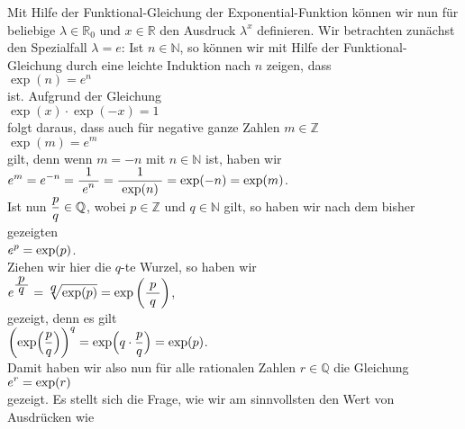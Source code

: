 \remark
Mit Hilfe der Funktional-Gleichung der Exponential-Funktion k\"onnen wir nun f\"ur beliebige $\lambda \in \mathbb{R}_0$
und $x \in \mathbb{R}$ den Ausdruck $\lambda^x$ definieren.  Wir betrachten zun\"achst den Spezialfall
$\lambda = e$:
Ist $n \in \mathbb{N}$, so k\"onnen wir mit Hilfe der Funktional-Gleichung durch eine leichte Induktion
nach $n$ zeigen, dass 
\\[0.2cm]
\hspace*{1.3cm}
$\exp(n) = e^n$
\\[0.2cm]
ist.  Aufgrund der Gleichung
\\[0.2cm]
\hspace*{1.3cm}
$\exp(x) \cdot \exp(-x) = 1$
\\[0.2cm]
folgt daraus, dass auch f\"ur negative ganze Zahlen $m \in \mathbb{Z}$ 
\\[0.2cm]
\hspace*{1.3cm}
$\exp(m) = e^m$
\\[0.2cm]
gilt, denn wenn $m = -n$ mit $n \in \mathbb{N}$ ist, haben wir
\\[0.2cm]
\hspace*{1.3cm}
$\displaystyle e^m = e^{-n} = \displaystyle\frac{\;\displaystyle1\;}{\;\displaystyle e^n\;} = \displaystyle\frac{\;\displaystyle1\;}{\;\displaystyle\exp(n)\;} = \exp(-n) = \exp(m)$.
\\[0.2cm]
Ist nun $\displaystyle\frac{p}{q} \in \mathbb{Q}$, wobei $p \in \mathbb{Z}$ und $q \in \mathbb{N}$ gilt, so haben wir 
nach dem bisher gezeigten
\\[0.2cm]
\hspace*{1.3cm}
$\displaystyle e^p = \exp(p)$.
\\[0.2cm]
Ziehen wir hier die $q$-te Wurzel, so haben wir
\\[0.2cm]
\hspace*{1.3cm}
$\displaystyle e^{\textstyle\frac{\;\textstyle p\;}{\;\textstyle q\;}} = \sqrt[\textstyle q]{\exp(p)} = \exp\left(\displaystyle\frac{\;\displaystyle p\;}{\;\displaystyle q\;}\right)$,
\\[0.2cm]
gezeigt, denn es gilt
\\[0.2cm]
\hspace*{1.3cm}
$\displaystyle\left(\exp\Bigl(\frac{p}{q}\Bigr)\right)^q = \exp\Bigl(q \cdot \frac{p}{q}\Bigr) = \exp(p)$.
\\[0.2cm]
Damit haben wir also nun f\"ur alle rationalen Zahlen $r \in \mathbb{Q}$ die Gleichung
\\[0.2cm]
\hspace*{1.3cm}
$\displaystyle e^r = \exp(r)$
\\[0.2cm]
gezeigt.  Es stellt sich die Frage, wie wir am sinnvollsten den Wert von Ausdr\"ucken wie
\\[0.2cm]
\hspace*{1.3cm}
